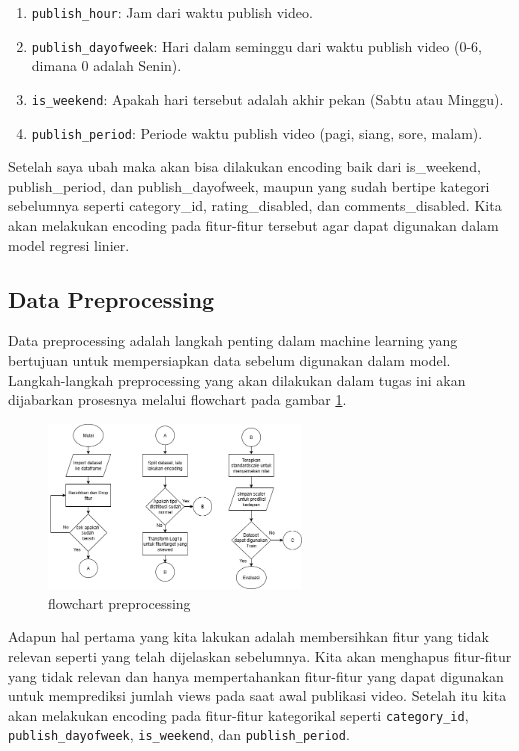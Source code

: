 \begin{enumerate}
    \item \texttt{publish\_hour}: Jam dari waktu publish video.
    \item \texttt{publish\_dayofweek}: Hari dalam seminggu dari waktu publish video (0-6, dimana 0 adalah Senin).
    \item \texttt{is\_weekend}: Apakah hari tersebut adalah akhir pekan (Sabtu atau Minggu).
    \item \texttt{publish\_period}: Periode waktu publish video (pagi, siang, sore, malam).
\end{enumerate}

Setelah saya ubah maka akan bisa dilakukan encoding baik dari is\_weekend, publish\_period, dan publish\_dayofweek, maupun yang sudah bertipe kategori sebelumnya seperti category\_id, rating\_disabled, dan comments\_disabled. Kita akan melakukan encoding pada fitur-fitur tersebut agar dapat digunakan dalam model regresi linier.

\subsection{Data Preprocessing}
Data preprocessing adalah langkah penting dalam machine learning yang bertujuan untuk mempersiapkan data sebelum digunakan dalam model. Langkah-langkah preprocessing yang akan dilakukan dalam tugas ini akan dijabarkan prosesnya melalui flowchart pada gambar \ref{fig:flowchart_preprocessing}.

\begin{figure}[ht]
    \centering
    \includegraphics[width=0.6\textwidth]{gambar/flowchart1.png}
    \caption{flowchart preprocessing}
    \label{fig:flowchart_preprocessing}
\end{figure}

Adapun hal pertama yang kita lakukan adalah membersihkan fitur yang tidak relevan seperti yang telah dijelaskan sebelumnya. Kita akan menghapus fitur-fitur yang tidak relevan dan hanya mempertahankan fitur-fitur yang dapat digunakan untuk memprediksi jumlah views pada saat awal publikasi video. Setelah itu kita akan melakukan encoding pada fitur-fitur kategorikal seperti \texttt{category\_id}, \texttt{publish\_dayofweek}, \texttt{is\_weekend}, dan \texttt{publish\_period}.

